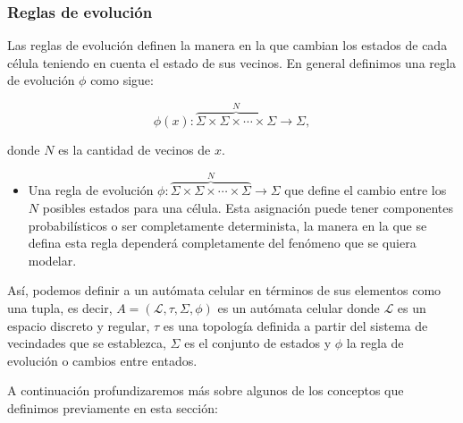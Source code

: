\subsubsection{Reglas de evolución}

Las reglas de evolución definen la manera en la que cambian los estados de cada célula teniendo en cuenta el estado de sus vecinos. En general definimos una regla de evolución $\phi$ como sigue:

$$\phi(x):\overbrace{\Sigma\times\Sigma\times\cdots\times\Sigma}^{N}\longrightarrow\Sigma,$$

donde $N$ es la cantidad de vecinos de $x$.

\begin{itemize}
    \item Una regla de evolución $\phi:\overbrace{\Sigma\times\Sigma\times\cdots\times\Sigma}^{N}\to\Sigma$ que define el cambio entre los $N$ posibles estados para una célula. Esta asignación puede tener componentes probabilísticos o ser completamente determinista, la manera en la que se defina esta regla dependerá completamente del fenómeno que se quiera modelar.
\end{itemize}

Así, podemos definir a un autómata celular en términos de sus elementos como una tupla, es decir, $A = (\mathcal{L}, \tau, \Sigma, \phi)$ es un autómata celular donde $\mathcal{L}$ es un espacio discreto y regular, $\tau$ es una topología definida a partir del sistema de vecindades que se establezca, $\Sigma$ es el conjunto de estados y $\phi$ la regla de evolución o cambios entre entados.

A continuación profundizaremos más sobre algunos de los conceptos que definimos previamente en esta sección:

